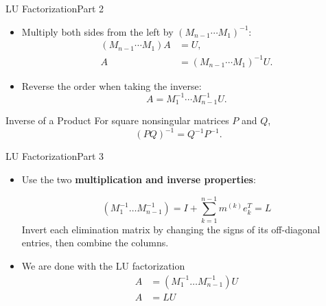 \documentclass[10pt]{beamer}
\begin{document}

\begin{frame}{LU Factorization}{Part 2}

\begin{itemize}
    \item[3.] Multiply both sides from the left by
    $(M_{n-1}\cdots M_1)^{-1}$:
    \begin{align*}
        (M_{n-1}\cdots M_1)A &= U,\\
        A &= (M_{n-1}\cdots M_1)^{-1}U.
    \end{align*}

    \item[4.] Reverse the order when taking the inverse:
    \[
        A=M_1^{-1}\cdots M_{n-1}^{-1}U.
    \]
\end{itemize}

\begin{block}{Inverse of a Product}
For square nonsingular matrices $P$ and $Q$,
\[
    (PQ)^{-1}=Q^{-1}P^{-1}.
\]
\end{block}

\end{frame}


\begin{frame}{LU Factorization}{Part 3}

\begin{itemize}
        
    \item[5.] Use the two \textbf{multiplication and inverse properties}: 

    $$(M_1^{-1} \dots M_{n-1}^{-1}) = I + \sum_{k=1}^{n-1} m^{(k)}e_k^T = L$$
    Invert each elimination matrix by changing the signs
of its off-diagonal entries, then combine the columns.

    \item[6.] We are done with the LU factorization 
           \begin{align*}
            A & = (M_1^{-1} \dots M_{n-1}^{-1})U\\
            A & = LU
        \end{align*}
        

\end{itemize}
\end{frame}
\end{document}
